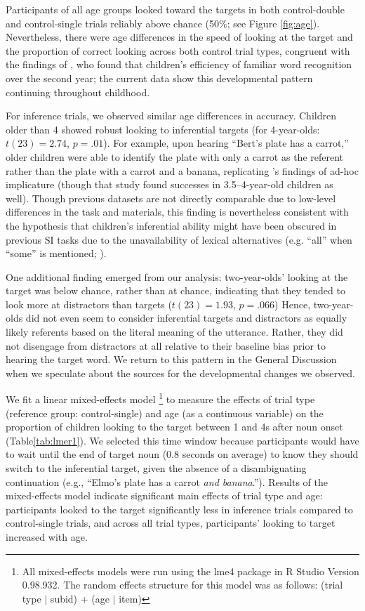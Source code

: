 \documentclass[10pt,letterpaper]{article}
\begin{document}
Participants of all age groups looked toward the targets in both control-double and control-single trials reliably above chance (50\%; see Figure \ref{fig:age}). Nevertheless, there were age differences in the speed of looking at the target and the proportion of correct looking across both control trial types, congruent with the findings of , who found that children's efficiency of familiar word recognition over the second year; the current data show this developmental pattern continuing throughout childhood. 

For inference trials, we observed similar age differences in accuracy. Children older than 4 showed robust looking to inferential targets (for 4-year-olds: $t(23) = 2.74$, $p =.01$). For example, upon hearing ``Bert's plate has a carrot,'' older children were able to identify the plate with only a carrot as the referent rather than the plate with a carrot and a banana, replicating 's findings of ad-hoc implicature (though that study found successes in 3.5--4-year-old children as well). Though previous datasets are not directly comparable due to low-level differences in the task and materials, this finding is nevertheless consistent with the hypothesis that children's inferential ability might have been obscured in previous SI tasks due to the unavailability of lexical alternatives (e.g. ``all'' when ``some'' is mentioned; ).

One additional finding emerged from our analysis: two-year-olds' looking at the target was below chance, rather than at chance, indicating that they tended to look more at distractors than targets ($t(23)  = 1.93$, $p = .066$) Hence, two-year-olds did not even seem to consider inferential targets and distractors as equally likely referents based on the literal meaning of the utterance. Rather, they did not disengage from distractors at all relative to their baseline bias prior to hearing the target word. We return to this pattern in the General Discussion when we speculate about the sources for the developmental changes we observed. 

We fit a linear mixed-effects model \footnote{All mixed-effects models were run using the lme4 package in R Studio Version 0.98.932. The random effects structure for this model was as follows: (trial type $|$ subid) + (age $|$ item)} to measure the effects of trial type (reference group: control-single) and age (as a continuous variable) on the proportion of children looking to the target between 1 and 4s after noun onset (Table\ref{tab:lmer1}). We selected this time window because participants would have to wait until the end of target noun (0.8 seconds on average) to know they should switch to the inferential target, given the absence of a disambiguating continuation (e.g., ``Elmo's plate has a carrot \emph{and banana}.''). Results of the mixed-effects model indicate significant main effects of trial type and age: participants looked to the target significantly less in inference trials compared to control-single trials, and across all trial types, participants' looking to target increased with age. 
\end{document}
